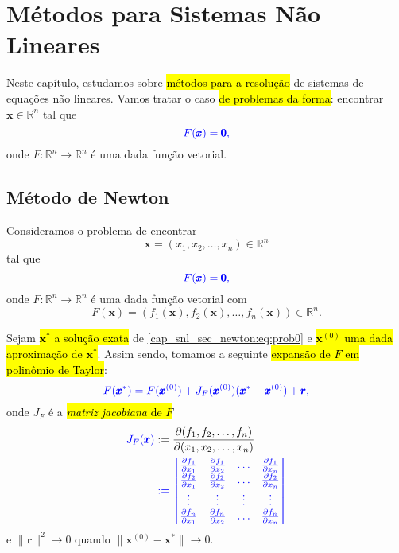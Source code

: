 

\chapter{Métodos para Sistemas Não Lineares}\label{cap_snl}

Neste capítulo, estudamos sobre \hl{métodos para a resolução} de sistemas de equações não lineares. Vamos tratar o caso \hl{de problemas da forma}: encontrar $\pmb{x}\in\mathbb{R}^n$ tal que
\begin{equation}\color{blue}F(\pmb{x}) = \pmb{0},
\end{equation}
onde $F:\mathbb{R}^n\to\mathbb{R}^n$ é uma dada função vetorial.

\section{Método de Newton}\label{cap_snl_sec_newton}

Consideramos o problema de encontrar
\begin{equation}
  \pmb{x} = (x_1, x_2, \dotsc, x_n)\in\mathbb{R}^n
\end{equation}
tal que
\begin{equation}\label{cap_snl_sec_newton:eq:prob0}\color{blue}F(\pmb{x}) = \pmb{0},
\end{equation}
onde $F:\mathbb{R}^n\to\mathbb{R}^n$ é uma dada função vetorial com
\begin{equation}
  F(\pmb{x}) = (f_1(\pmb{x}), f_2(\pmb{x}), \dotsc, f_n(\pmb{x}))\in\mathbb{R}^n.
\end{equation}

Sejam \hl{$\pmb{x}^*$ a solução exata} de \eqref{cap_snl_sec_newton:eq:prob0} e \hl{$\pmb{x}^{(0)}$ uma dada aproximação de $\pmb{x}^*$}. Assim sendo, tomamos a seguinte \hl{expansão de $F$ em polinômio de Taylor}{\taylor}:
\begin{equation}\color{blue}F(\pmb{x}^*) = F(\pmb{x}^{(0)}) + J_F(\pmb{x}^{(0)})(\pmb{x}^*-\pmb{x}^{(0)}) + \pmb{r},
\end{equation}
onde $J_F$ é a \hl{\emph{matriz jacobiana}{\jacobi} de $F$}
\begin{align}
  \color{blue}J_F(\pmb{x}) &:= \frac{\partial(f_1, f_2, \dotsc, f_n)}{\partial(x_1, x_2, \dotsc, x_n)}\\
  &\color{blue}:= \begin{bmatrix}
    \frac{\partial f_1}{\partial x_1} & \frac{\partial f_1}{\partial x_2} & \ldots & \frac{\partial f_1}{\partial x_n}\\
    \frac{\partial f_2}{\partial x_1} & \frac{\partial f_2}{\partial x_2} & \ldots & \frac{\partial f_2}{\partial x_n}\\
    \vdots & \vdots & \vdots & \vdots \\
    \frac{\partial f_n}{\partial x_1} & \frac{\partial f_n}{\partial x_2} & \ldots & \frac{\partial f_n}{\partial x_n}\\
  \end{bmatrix}
\end{align}
e $\|\pmb{r}\|^2\to 0$ quando $\|\pmb{x}^{(0)}-\pmb{x}^*\|\to 0$. 

